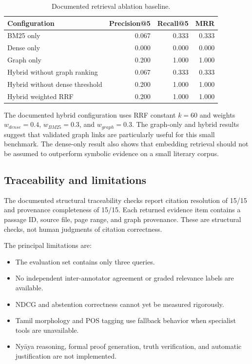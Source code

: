 \documentclass[11pt,a4paper]{article}
\begin{document}
\begin{table}[ht]
\centering
\caption{Documented retrieval ablation baseline.}
\label{tab:ablation}
\small
\begin{tabular}{lrrr}
\toprule
\textbf{Configuration} & \textbf{Precision@5} & \textbf{Recall@5} & \textbf{MRR} \\
\midrule
BM25 only & 0.067 & 0.333 & 0.333 \\
Dense only & 0.000 & 0.000 & 0.000 \\
Graph only & 0.200 & 1.000 & 1.000 \\
Hybrid without graph ranking & 0.067 & 0.333 & 0.333 \\
Hybrid without dense threshold & 0.200 & 1.000 & 1.000 \\
Hybrid weighted RRF & 0.200 & 1.000 & 1.000 \\
\bottomrule
\end{tabular}
\end{table}

The documented hybrid configuration uses RRF constant $k=60$ and weights $w_{dense}=0.4$, $w_{BM25}=0.3$, and $w_{graph}=0.3$. The graph-only and hybrid results suggest that validated graph links are particularly useful for this small benchmark. The dense-only result also shows that embedding retrieval should not be assumed to outperform symbolic evidence on a small literary corpus.

\subsection{Traceability and limitations}

The documented structural traceability checks report citation resolution of 15/15 and provenance completeness of 15/15. Each returned evidence item contains a passage ID, source file, page range, and graph provenance. These are structural checks, not human judgments of citation correctness.

The principal limitations are:
\begin{itemize}[leftmargin=*]
  \item The evaluation set contains only three queries.
  \item No independent inter-annotator agreement or graded relevance labels are available.
  \item NDCG and abstention correctness cannot yet be measured rigorously.
  \item Tamil morphology and POS tagging use fallback behavior when specialist tools are unavailable.
  \item Ny\={a}ya reasoning, formal proof generation, truth verification, and automatic justification are not implemented.
\end{itemize}
\end{document}
